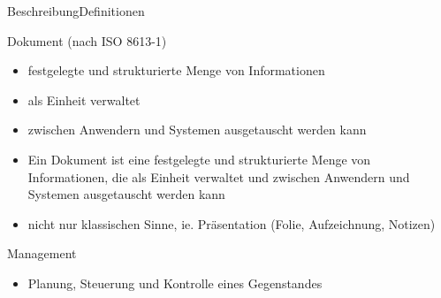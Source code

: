 \begin{frame}{Beschreibung}{Definitionen}
	\begin{block}{Dokument (nach ISO 8613-1)}
		\begin{itemize}
			\item{festgelegte und strukturierte Menge von Informationen}
			\item{als Einheit verwaltet}
			\item{zwischen Anwendern und Systemen ausgetauscht werden kann}
		\end{itemize}
		{
			\begin{itemize}
				\item Ein Dokument ist eine festgelegte und strukturierte Menge von Informationen, die als Einheit verwaltet und zwischen Anwendern und Systemen ausgetauscht werden kann
				\item nicht nur klassischen Sinne, ie. Präsentation (Folie, Aufzeichnung, Notizen)
			\end{itemize}
		}
	\end{block}
	\begin{block}{Management}
		\begin{itemize}
			\item{Planung, Steuerung und Kontrolle eines Gegenstandes}
		\end{itemize}
	\end{block}
\end{frame}